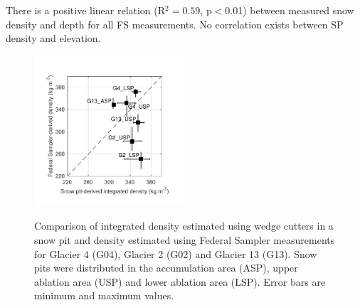 \documentclass[review,oneside, letterpaper]{igs}
\begin{document}
There is a positive linear relation (R$^2= 0.59$, p$<$0.01) between measured snow density and depth for all FS measurements. No correlation exists between SP density and elevation.


\begin{figure}
	\centering
	\includegraphics[width =0.5\textwidth]{SPvsFS.pdf}\\
	\caption{Comparison of integrated density estimated using wedge cutters in a snow pit and density estimated using Federal Sampler measurements for Glacier 4 (G04), Glacier 2 (G02) and Glacier 13 (G13). Snow pits were distributed in the accumulation area (ASP), upper ablation area (USP) and lower ablation area (LSP). Error bars are minimum and maximum values.}
	\label{fig:density_pitVStube}
\end{figure}
\end{document}
